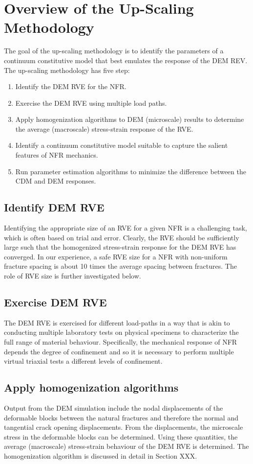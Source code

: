 \section{Overview of the Up-Scaling Methodology}
The goal of the up-scaling methodology is to identify the parameters of a continuum constitutive model that best emulates the response of the DEM REV. The up-scaling methodology has five step: 
\begin{enumerate}
    \item Identify the DEM RVE for the NFR.
	\item Exercise the  DEM RVE using multiple load paths.
	\item Apply homogenization algorithms to DEM (microscale) results to determine the average (macroscale) stress-strain response of the RVE.
	\item Identify a continuum constitutive model suitable to capture the salient features of NFR mechanics.
	\item Run parameter estimation algorithms to minimize the difference between the CDM and DEM responses.
\end{enumerate}

\subsection*{Identify DEM RVE}
Identifying the appropriate size of an RVE for a given NFR is a challenging task, which is often based on trial and error. Clearly, the RVE should be sufficiently large such that the homogenized stress-strain response for the DEM RVE has converged. In our experience, a safe RVE size for a NFR with non-uniform fracture spacing is about 10 times the average spacing between fractures. The role of RVE size is further investigated below.

\subsection*{Exercise DEM RVE}
The DEM RVE is exercised for different load-paths in a way that is akin  to conducting multiple laboratory tests on physical specimens to characterize the full range of material behaviour. Specifically, the mechanical response of NFR depends the degree of confinement and so it is necessary to perform multiple virtual triaxial tests a different levels of confinement. 

\subsection*{Apply homogenization algorithms}
Output from the DEM simulation include the nodal displacements of the deformable blocks between the natural fractures and therefore the normal and tangential crack opening displacements. From the displacements, the microscale stress in the deformable blocks can be determined.  Using these quantities, the average (macroscale) stress-strain behaviour of the DEM RVE is determined. The homogenization algorithm is discussed in detail in Section XXX.

